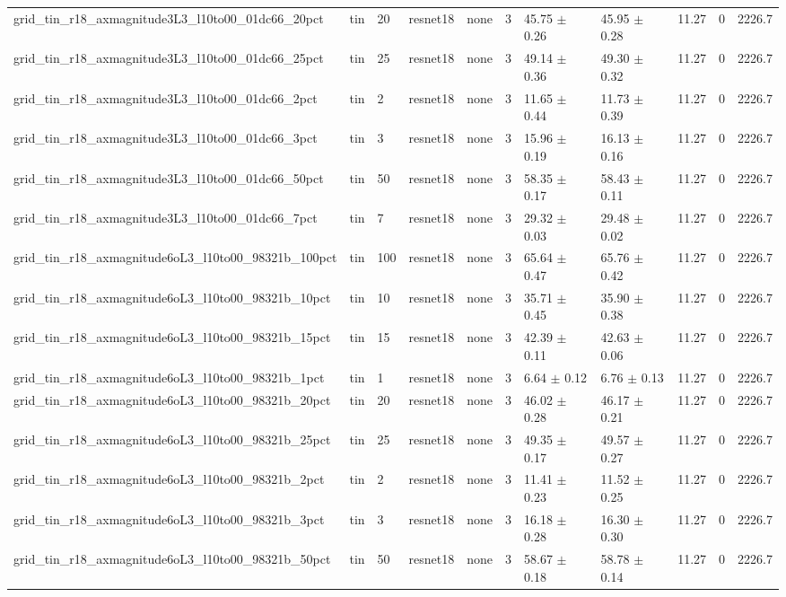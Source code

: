\begin{tabular}{lllllllllll}
grid_tin_r18_axmagnitude3L3_l10to00_01dc66_20pct & tin & 20 & resnet18 & none & 3 & 45.75 $\pm$ 0.26 & 45.95 $\pm$ 0.28 & 11.27 & 0 & 2226.7 \\
grid_tin_r18_axmagnitude3L3_l10to00_01dc66_25pct & tin & 25 & resnet18 & none & 3 & 49.14 $\pm$ 0.36 & 49.30 $\pm$ 0.32 & 11.27 & 0 & 2226.7 \\
grid_tin_r18_axmagnitude3L3_l10to00_01dc66_2pct & tin & 2 & resnet18 & none & 3 & 11.65 $\pm$ 0.44 & 11.73 $\pm$ 0.39 & 11.27 & 0 & 2226.7 \\
grid_tin_r18_axmagnitude3L3_l10to00_01dc66_3pct & tin & 3 & resnet18 & none & 3 & 15.96 $\pm$ 0.19 & 16.13 $\pm$ 0.16 & 11.27 & 0 & 2226.7 \\
grid_tin_r18_axmagnitude3L3_l10to00_01dc66_50pct & tin & 50 & resnet18 & none & 3 & 58.35 $\pm$ 0.17 & 58.43 $\pm$ 0.11 & 11.27 & 0 & 2226.7 \\
grid_tin_r18_axmagnitude3L3_l10to00_01dc66_7pct & tin & 7 & resnet18 & none & 3 & 29.32 $\pm$ 0.03 & 29.48 $\pm$ 0.02 & 11.27 & 0 & 2226.7 \\
grid_tin_r18_axmagnitude6oL3_l10to00_98321b_100pct & tin & 100 & resnet18 & none & 3 & 65.64 $\pm$ 0.47 & 65.76 $\pm$ 0.42 & 11.27 & 0 & 2226.7 \\
grid_tin_r18_axmagnitude6oL3_l10to00_98321b_10pct & tin & 10 & resnet18 & none & 3 & 35.71 $\pm$ 0.45 & 35.90 $\pm$ 0.38 & 11.27 & 0 & 2226.7 \\
grid_tin_r18_axmagnitude6oL3_l10to00_98321b_15pct & tin & 15 & resnet18 & none & 3 & 42.39 $\pm$ 0.11 & 42.63 $\pm$ 0.06 & 11.27 & 0 & 2226.7 \\
grid_tin_r18_axmagnitude6oL3_l10to00_98321b_1pct & tin & 1 & resnet18 & none & 3 & 6.64 $\pm$ 0.12 & 6.76 $\pm$ 0.13 & 11.27 & 0 & 2226.7 \\
grid_tin_r18_axmagnitude6oL3_l10to00_98321b_20pct & tin & 20 & resnet18 & none & 3 & 46.02 $\pm$ 0.28 & 46.17 $\pm$ 0.21 & 11.27 & 0 & 2226.7 \\
grid_tin_r18_axmagnitude6oL3_l10to00_98321b_25pct & tin & 25 & resnet18 & none & 3 & 49.35 $\pm$ 0.17 & 49.57 $\pm$ 0.27 & 11.27 & 0 & 2226.7 \\
grid_tin_r18_axmagnitude6oL3_l10to00_98321b_2pct & tin & 2 & resnet18 & none & 3 & 11.41 $\pm$ 0.23 & 11.52 $\pm$ 0.25 & 11.27 & 0 & 2226.7 \\
grid_tin_r18_axmagnitude6oL3_l10to00_98321b_3pct & tin & 3 & resnet18 & none & 3 & 16.18 $\pm$ 0.28 & 16.30 $\pm$ 0.30 & 11.27 & 0 & 2226.7 \\
grid_tin_r18_axmagnitude6oL3_l10to00_98321b_50pct & tin & 50 & resnet18 & none & 3 & 58.67 $\pm$ 0.18 & 58.78 $\pm$ 0.14 & 11.27 & 0 & 2226.7 \\

\end{tabular}
